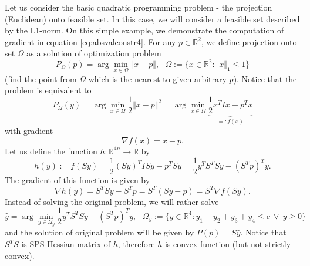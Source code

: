 \begin{example}
Let us consider the basic quadratic programming problem - the projection (Euclidean) onto feasible set. In this case, we will consider a feasible set described by the L1-norm.
On this simple example, we demonstrate the computation of gradient in equation \eqref{eq:absvalconstr4}.
For any $p \in \mathbb{R}^2$, we define projection onto set $\Omega$ as a solution of optimization problem
\begin{displaymath}
 P_{\Omega} (p) = \arg \min\limits_{x \in \Omega} \Vert x - p \Vert, ~~~ \Omega := \lbrace x \in \mathbb{R}^2: \Vert x \Vert_1 \leq 1 \rbrace
\end{displaymath}
(find the point from $\Omega$ which is the nearest to given arbitrary $p$).
Notice that the problem is equivalent to
\begin{displaymath}
 P_{\Omega} (y) = \arg \min\limits_{x \in \Omega} \frac{1}{2}\Vert x - p \Vert^2 = \arg \min\limits_{x \in \Omega} \underbrace{\frac{1}{2} x^T I x - p^T x}_{=: f(x)}
\end{displaymath}
with gradient
\begin{displaymath}
 \nabla f(x) = x - p.
\end{displaymath}
Let us define the function $h: \mathbb{R}^{4n} \rightarrow \mathbb{R}$ by
\begin{displaymath}
 h(y) := f(Sy) = \frac{1}{2} (Sy)^T I Sy - p^T Sy = \frac{1}{2} y^T S^T S y - (S^Tp)^T y.
\end{displaymath}
The gradient of this function is given by
\begin{displaymath}
 \nabla h(y) = S^T S y - S^Tp = S^T ( Sy-p) = S^T \nabla f(Sy).
\end{displaymath}
Instead of solving the original problem, we will rather solve
\begin{displaymath}
 \hat{y} = \arg \min\limits_{y \in \Omega_y} \frac{1}{2} y^T S^T S y - (S^Tp)^T y, ~~~ \Omega_y := \lbrace y \in \mathbb{R}^4: y_1 + y_2 + y_3 + y_4 \leq c ~ \vee ~ y \geq 0 \rbrace
\end{displaymath}
and the solution of original problem will be given by $P(p) = S\hat{y}$. Notice that $S^TS$ is SPS Hessian matrix of $h$, therefore $h$ is convex function (but not strictly convex).
\end{example}
